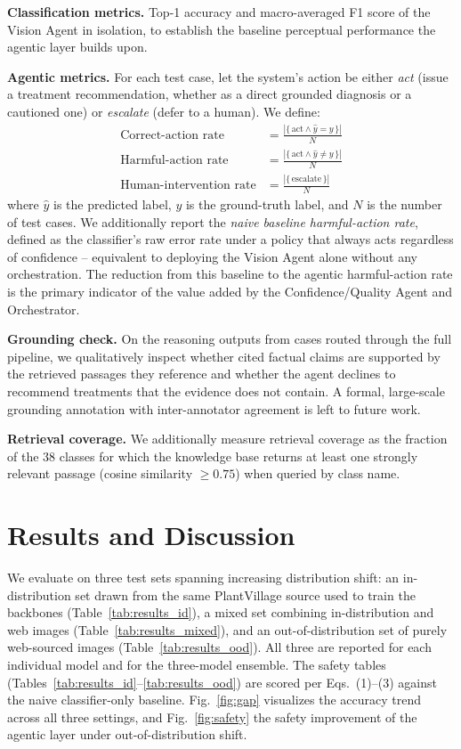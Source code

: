 \documentclass[conference]{IEEEtran}
\begin{document}
\textbf{Classification metrics.} Top-1 accuracy and macro-averaged F1 score of the Vision Agent in isolation, to establish the baseline perceptual performance the agentic layer builds upon.

\textbf{Agentic metrics.} For each test case, let the system's action be either \emph{act} (issue a treatment recommendation, whether as a direct grounded diagnosis or a cautioned one) or \emph{escalate} (defer to a human). We define:
\begin{align}
\text{Correct-action rate} &= \frac{|\{\,\text{act} \wedge \hat{y}=y\,\}|}{N} \\
\text{Harmful-action rate} &= \frac{|\{\,\text{act} \wedge \hat{y}\neq y\,\}|}{N} \\
\text{Human-intervention rate} &= \frac{|\{\,\text{escalate}\,\}|}{N}
\end{align}
where $\hat{y}$ is the predicted label, $y$ is the ground-truth label, and $N$ is the number of test cases. We additionally report the \emph{naive baseline harmful-action rate}, defined as the classifier's raw error rate under a policy that always acts regardless of confidence -- equivalent to deploying the Vision Agent alone without any orchestration. The reduction from this baseline to the agentic harmful-action rate is the primary indicator of the value added by the Confidence/Quality Agent and Orchestrator.

\textbf{Grounding check.} On the reasoning outputs from cases routed through the full pipeline, we qualitatively inspect whether cited factual claims are supported by the retrieved passages they reference and whether the agent declines to recommend treatments that the evidence does not contain. A formal, large-scale grounding annotation with inter-annotator agreement is left to future work.

\textbf{Retrieval coverage.} We additionally measure retrieval coverage as the fraction of the 38 classes for which the knowledge base returns at least one strongly relevant passage (cosine similarity $\geq 0.75$) when queried by class name.

\section{Results and Discussion}
\label{sec:results}

We evaluate on three test sets spanning increasing distribution shift: an in-distribution set drawn from the same PlantVillage source used to train the backbones (Table~\ref{tab:results_id}), a mixed set combining in-distribution and web images (Table~\ref{tab:results_mixed}), and an out-of-distribution set of purely web-sourced images (Table~\ref{tab:results_ood}). All three are reported for each individual model and for the three-model ensemble. The safety tables (Tables~\ref{tab:results_id}--\ref{tab:results_ood}) are scored per Eqs.~(1)--(3) against the naive classifier-only baseline. Fig.~\ref{fig:gap} visualizes the accuracy trend across all three settings, and Fig.~\ref{fig:safety} the safety improvement of the agentic layer under out-of-distribution shift.
\end{document}
